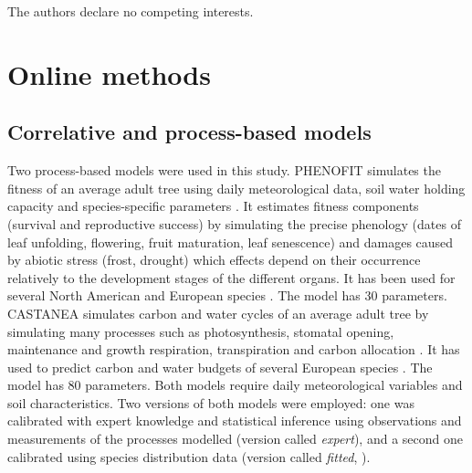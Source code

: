 \documentclass[pdflatex, sn-nature]{sn-jnl}%
\newcommand{\textappr}{\raisebox{0.5ex}{\texttildelow}} %
\begin{document}
The authors declare no competing interests.





\section{Online methods}\label{methods}

\subsection{Correlative and process-based models}\label{models}

Two process-based models were used in this study. 
PHENOFIT simulates the fitness of an average adult tree using daily meteorological data, soil water holding capacity and species-specific parameters \cite{Chuine2001}. It estimates fitness components (survival and reproductive success) by simulating the precise phenology (dates of leaf unfolding, flowering, fruit maturation, leaf senescence) and damages caused by abiotic stress (frost, drought) which effects depend on their occurrence relatively to the development stages of the different organs. It has been used for several North American and European species \cite{Morin2007, Saltre2013, Duputie2015, Gauzere2020}. The model has \textappr30 parameters. 
CASTANEA simulates carbon and water cycles of an average adult tree by simulating many processes such as photosynthesis, stomatal opening, maintenance and growth respiration, transpiration and carbon allocation  \cite{Dufrene2005}. It has used to predict carbon and water budgets of several European species \cite{Davi2006, Delpierre2012, Davi2017}. 
The model has \textappr80 parameters. 
Both models require daily meteorological variables and soil characteristics. Two versions of both models were employed: one was calibrated with expert knowledge and statistical inference using observations and measurements of the processes modelled (version called \emph{expert}), and a second one calibrated using species distribution data (version called \emph{fitted}, \cite{VanderMeersch2023}).
  
\end{document}
